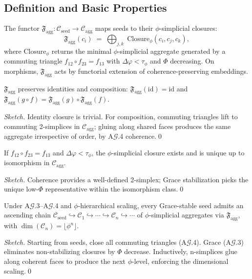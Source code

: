\subsection{Definition and Basic Properties}

\begin{definition}
The functor
\(\mathfrak F_{\mathrm{agg}}: \mathcal C_{\mathrm{seed}}\to\mathcal C_{\mathrm{agg}}\)
maps seeds to their $\phi$-simplicial closures:
\[
\mathfrak F_{\mathrm{agg}}(c_i)\;=\;\bigoplus_{j,k}\;\mathrm{Closure}_\phi(c_i,c_j,c_k),
\]
where $\mathrm{Closure}_\phi$ returns the minimal $\phi$-simplicial aggregate generated by a
commuting triangle $f_{12}\circ f_{23}=f_{13}$ with $\Delta\varphi<\tau_\phi$ and $\Phi$ decreasing.
On morphisms, $\mathfrak F_{\mathrm{agg}}$ acts by functorial extension of coherence-preserving embeddings.
\end{definition}

\begin{lemma}[Functoriality]
$\mathfrak F_{\mathrm{agg}}$ preserves identities and composition: $\mathfrak F_{\mathrm{agg}}(\mathrm{id})=\mathrm{id}$ and
$\mathfrak F_{\mathrm{agg}}(g\circ f)=\mathfrak F_{\mathrm{agg}}(g)\circ \mathfrak F_{\mathrm{agg}}(f)$.
\end{lemma}
\begin{proof}[Sketch]
Identity closure is trivial. For composition, commuting triangles lift to commuting
2-simplices in $\mathcal C_{\mathrm{agg}}$; gluing along shared faces produces the same
aggregate irrespective of order, by A$\mathcal G$.4 coherence.\qed
\end{proof}

\begin{lemma}
If $f_{12}\circ f_{23}=f_{13}$ and $\Delta\varphi<\tau_\phi$, the $\phi$-simplicial closure exists and is unique up to isomorphism in $\mathcal C_{\mathrm{agg}}$.
\end{lemma}
\begin{proof}[Sketch]
Coherence provides a well-defined 2-simplex; Grace stabilization picks the unique low-$\Phi$ representative within the isomorphism class.\qed
\end{proof}

\begin{theorem}
Under A$\mathcal G$.3--A$\mathcal G$.4 and $\phi$-hierarchical scaling, every Grace-stable seed admits an ascending chain
\(\mathcal C_{\mathrm{seed}}\hookrightarrow \mathcal C_1\hookrightarrow\cdots\hookrightarrow\mathcal C_n\hookrightarrow\cdots\)
of $\phi$-simplicial aggregates via $\mathfrak F_{\mathrm{agg}}$, with $\dim(\mathcal C_n)=\lfloor \phi^n\rfloor$.
\end{theorem}
\begin{proof}[Sketch]
Starting from seeds, close all commuting triangles (A$\mathcal G$.4). Grace (A$\mathcal G$.3) eliminates non-stabilizing
closures by $\Phi$ decrease. Inductively, n-simplices glue along coherent faces to produce the
next $\phi$-level, enforcing the dimensional scaling.\qed
\end{proof}

